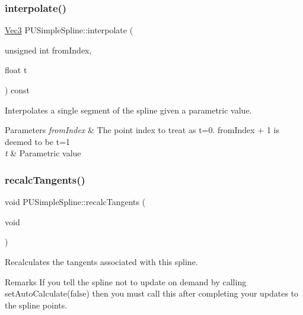 \subsubsection{\texorpdfstring{interpolate()}{interpolate()}\hspace{0.1cm}{\footnotesize\ttfamily [4/4]}}
{\footnotesize\ttfamily \hyperlink{classVec3}{Vec3} P\+U\+Simple\+Spline\+::interpolate (\begin{DoxyParamCaption}\item[{unsigned int}]{from\+Index,  }\item[{float}]{t }\end{DoxyParamCaption}) const}

Interpolates a single segment of the spline given a parametric value. 
\begin{DoxyParams}{Parameters}
{\em from\+Index} & The point index to treat as t=0. from\+Index + 1 is deemed to be t=1 \\
\hline
{\em t} & Parametric value \\
\hline
\end{DoxyParams}
\mbox{\label{classPUSimpleSpline_a9f888891b07d83f57b68da9b926157c6}} 
\subsubsection{\texorpdfstring{recalc\+Tangents()}{recalcTangents()}\hspace{0.1cm}{\footnotesize\ttfamily [1/2]}}
{\footnotesize\ttfamily void P\+U\+Simple\+Spline\+::recalc\+Tangents (\begin{DoxyParamCaption}\item[{void}]{ }\end{DoxyParamCaption})}

Recalculates the tangents associated with this spline. \begin{DoxyRemark}{Remarks}
If you tell the spline not to update on demand by calling set\+Auto\+Calculate(false) then you must call this after completing your updates to the spline points. 
\end{DoxyRemark}
\mbox{\label{classPUSimpleSpline_a9f888891b07d83f57b68da9b926157c6}} 
